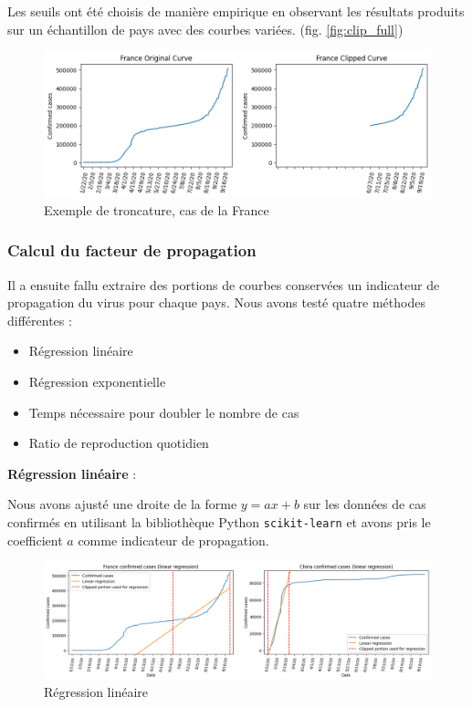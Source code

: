 \documentclass[12pt]{iEEEtran}
\begin{document}
Les seuils ont été choisis de manière empirique en observant les résultats produits sur un échantillon de pays
avec des courbes variées. (fig. \ref{fig:clip_full})

\begin{figure}[h]
    \centering
    \includegraphics[width=\columnwidth]{img/clip.png}
    \caption{Exemple de troncature, cas de la France}
    \label{fig:clip}
\end{figure}

\subsubsection{Calcul du facteur de propagation}
Il a ensuite fallu extraire des portions de courbes conservées un indicateur de propagation du virus
pour chaque pays. Nous avons testé quatre méthodes différentes :
\begin{itemize}
    \item Régression linéaire
    \item Régression exponentielle
    \item Temps nécessaire pour doubler le nombre de cas
    \item Ratio de reproduction quotidien
\end{itemize}

\noindent\textbf{Régression linéaire} : 

Nous avons ajusté une droite de la forme $y = ax + b$ sur les données de cas confirmés en utilisant
la bibliothèque Python \texttt{scikit-learn} et avons pris le coefficient $a$ comme indicateur de
propagation.

\begin{figure}[h]
    \centering
    \includegraphics[width=\columnwidth]{img/lin_reg.png}
    \caption{Régression linéaire}

    \label{fig:lin_reg}
\end{figure}
\end{document}
